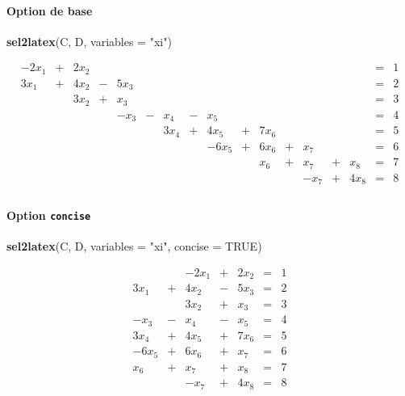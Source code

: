 \documentclass[]{article}
\newenvironment{Shaded}{\begin{snugshade}}{\end{snugshade}}
\newcommand{\DataTypeTok}[1]{\textcolor[rgb]{0.13,0.29,0.53}{#1}}
\newcommand{\KeywordTok}[1]{\textcolor[rgb]{0.13,0.29,0.53}{\textbf{#1}}}
\newcommand{\NormalTok}[1]{#1}
\newcommand{\OtherTok}[1]{\textcolor[rgb]{0.56,0.35,0.01}{#1}}
\newcommand{\StringTok}[1]{\textcolor[rgb]{0.31,0.60,0.02}{#1}}
\let\oldparagraph\paragraph
\renewcommand{\paragraph}[1]{\oldparagraph{#1}\mbox{}}
\begin{document}
\hypertarget{option-de-base}{%
\paragraph{Option de base}\label{option-de-base}}

\begin{Shaded}
\begin{Highlighting}[]
\KeywordTok{sel2latex}\NormalTok{(C, D, }\DataTypeTok{variables =} \StringTok{"xi"}\NormalTok{)}
\end{Highlighting}
\end{Shaded}

\[
\begin{array}{rrrrrrrrrrrrrrrrr}
-2 x_{1} & + & 2 x_{2} & & & & & & & & & & & & & = & 1 \\ 
3 x_{1} & + & 4 x_{2} & - & 5 x_{3} & & & & & & & & & & & = & 2 \\ 
& & 3 x_{2} & + & x_{3} & & & & & & & & & & & = & 3 \\ 
& & &  & -x_{3} & - & x_{4} & - & x_{5} & & & & & & & = & 4 \\ 
& & & & & & 3 x_{4} & + & 4 x_{5} & + & 7 x_{6} & & & & & = & 5 \\ 
& & & & & & &  & -6 x_{5} & + & 6 x_{6} & + & x_{7} & & & = & 6 \\ 
& & & & & & & & & & x_{6} & + & x_{7} & + & x_{8} & = & 7 \\ 
& & & & & & & & & & &  & -x_{7} & + & 4 x_{8} & = & 8 \\ 
\end{array}
\]

\hypertarget{option-concise}{%
\paragraph{\texorpdfstring{Option
\texttt{concise}}{Option concise}}\label{option-concise}}

\begin{Shaded}
\begin{Highlighting}[]
\KeywordTok{sel2latex}\NormalTok{(C, D, }\DataTypeTok{variables =} \StringTok{"xi"}\NormalTok{, }\DataTypeTok{concise =} \OtherTok{TRUE}\NormalTok{)}
\end{Highlighting}
\end{Shaded}

\[
\begin{array}{rrrrrrr}
& & -2 x_{1} & + & 2 x_{2} & = & 1 \\ 
3 x_{1} & + & 4 x_{2} & - & 5 x_{3} & = & 2 \\ 
& & 3 x_{2} & + & x_{3} & = & 3 \\ 
-x_{3} & - & x_{4} & - & x_{5} & = & 4 \\ 
3 x_{4} & + & 4 x_{5} & + & 7 x_{6} & = & 5 \\ 
-6 x_{5} & + & 6 x_{6} & + & x_{7} & = & 6 \\ 
x_{6} & + & x_{7} & + & x_{8} & = & 7 \\ 
& & -x_{7} & + & 4 x_{8} & = & 8 \\ 
\end{array}
\]
\end{document}
